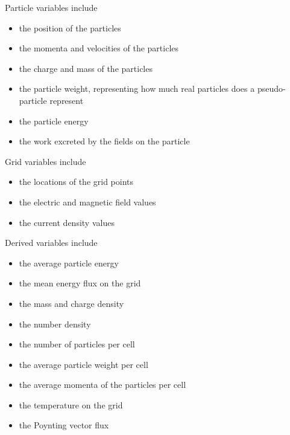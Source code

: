 \documentclass[12pt, class=report, crop=false]{standalone}
\begin{document}
Particle variables include
\begin{itemize}
  \item the position of the particles
  \item the momenta and velocities of the particles
  \item the charge and mass of the particles
  \item the particle weight, representing how much real particles does a pseudo-particle represent
  \item the particle energy
  \item the work excreted by the fields on the particle
\end{itemize}

Grid variables include
\begin{itemize}
  \item the locations of the grid points
  \item the electric and magnetic field values
  \item the current density values
\end{itemize}

Derived variables include
\begin{itemize}
  \item the average particle energy
  \item the mean energy flux on the grid
  \item the mass and charge density
  \item the number density
  \item the number of particles per cell
  \item the average particle weight per cell
  \item the average momenta of the particles per cell
  \item the temperature on the grid
  \item the Poynting vector flux
\end{itemize}
\end{document}
